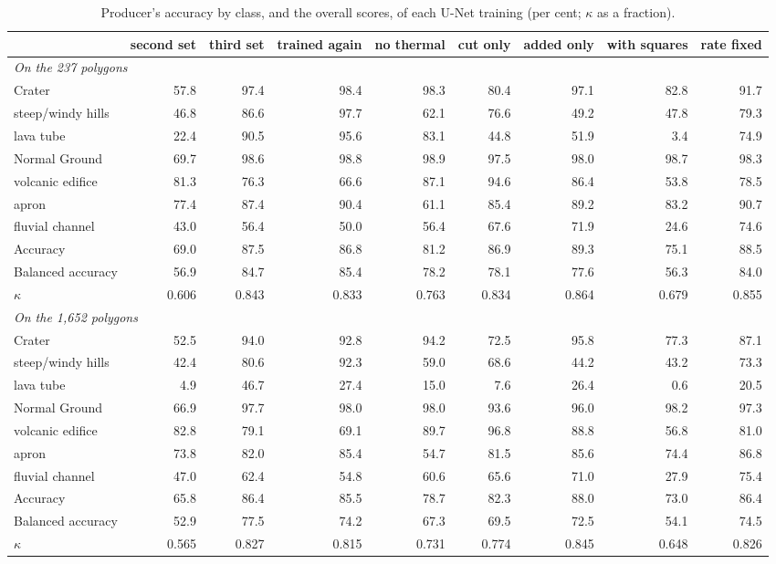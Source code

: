 \documentclass[twocolumn]{aastex701}
\begin{document}
\begin{table}[t]
\centering
\caption{Producer's accuracy by class, and the overall scores, of each U-Net training (per cent; $\kappa$ as a fraction). \label{tab:perclass}}
\small
\begin{tabular}{lrrrrrrrr}
\hline\hline
& second set & third set & trained again & no thermal & cut only & added only & with squares & rate fixed \\
\hline
\multicolumn{9}{l}{\emph{On the 237 polygons}} \\
Crater & 57.8 & 97.4 & 98.4 & 98.3 & 80.4 & 97.1 & 82.8 & 91.7 \\
steep/windy hills & 46.8 & 86.6 & 97.7 & 62.1 & 76.6 & 49.2 & 47.8 & 79.3 \\
lava tube & 22.4 & 90.5 & 95.6 & 83.1 & 44.8 & 51.9 & 3.4 & 74.9 \\
Normal Ground & 69.7 & 98.6 & 98.8 & 98.9 & 97.5 & 98.0 & 98.7 & 98.3 \\
volcanic edifice & 81.3 & 76.3 & 66.6 & 87.1 & 94.6 & 86.4 & 53.8 & 78.5 \\
apron & 77.4 & 87.4 & 90.4 & 61.1 & 85.4 & 89.2 & 83.2 & 90.7 \\
fluvial channel & 43.0 & 56.4 & 50.0 & 56.4 & 67.6 & 71.9 & 24.6 & 74.6 \\
Accuracy & 69.0 & 87.5 & 86.8 & 81.2 & 86.9 & 89.3 & 75.1 & 88.5 \\
Balanced accuracy & 56.9 & 84.7 & 85.4 & 78.2 & 78.1 & 77.6 & 56.3 & 84.0 \\
$\kappa$ & 0.606 & 0.843 & 0.833 & 0.763 & 0.834 & 0.864 & 0.679 & 0.855 \\
\hline
\multicolumn{9}{l}{\emph{On the 1,652 polygons}} \\
Crater & 52.5 & 94.0 & 92.8 & 94.2 & 72.5 & 95.8 & 77.3 & 87.1 \\
steep/windy hills & 42.4 & 80.6 & 92.3 & 59.0 & 68.6 & 44.2 & 43.2 & 73.3 \\
lava tube & 4.9 & 46.7 & 27.4 & 15.0 & 7.6 & 26.4 & 0.6 & 20.5 \\
Normal Ground & 66.9 & 97.7 & 98.0 & 98.0 & 93.6 & 96.0 & 98.2 & 97.3 \\
volcanic edifice & 82.8 & 79.1 & 69.1 & 89.7 & 96.8 & 88.8 & 56.8 & 81.0 \\
apron & 73.8 & 82.0 & 85.4 & 54.7 & 81.5 & 85.6 & 74.4 & 86.8 \\
fluvial channel & 47.0 & 62.4 & 54.8 & 60.6 & 65.6 & 71.0 & 27.9 & 75.4 \\
Accuracy & 65.8 & 86.4 & 85.5 & 78.7 & 82.3 & 88.0 & 73.0 & 86.4 \\
Balanced accuracy & 52.9 & 77.5 & 74.2 & 67.3 & 69.5 & 72.5 & 54.1 & 74.5 \\
$\kappa$ & 0.565 & 0.827 & 0.815 & 0.731 & 0.774 & 0.845 & 0.648 & 0.826 \\
\hline
\end{tabular}
\end{table}
\end{document}

